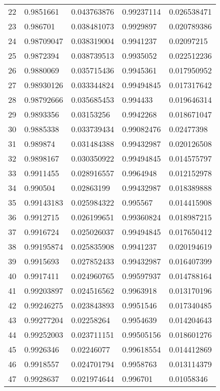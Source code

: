 \begin{table}[H]
{\begin{tabular}{@{}lllll@{}}
    22 & 0.9851661 & 0.043763876 & 0.99237114 & 0.026538471 \\
    23 & 0.986701 & 0.038481073 & 0.9929897 & 0.020789386 \\
    24 & 0.98709047 & 0.038319004 & 0.9941237 & 0.02097215 \\
    25 & 0.9872394 & 0.038739513 & 0.9935052 & 0.022512236 \\
    26 & 0.9880069 & 0.035715436 & 0.9945361 & 0.017950952 \\
    27 & 0.98930126 & 0.033344824 & 0.99494845 & 0.017317642 \\
    28 & 0.98792666 & 0.035685453 & 0.994433 & 0.019646314 \\
    29 & 0.9893356 & 0.03153256 & 0.9942268 & 0.018671047 \\
    30 & 0.9885338 & 0.033739434 & 0.99082476 & 0.02477398 \\
    31 & 0.989874 & 0.031484388 & 0.99432987 & 0.020126508 \\
    32 & 0.9898167 & 0.030350922 & 0.99494845 & 0.014575797 \\
    33 & 0.9911455 & 0.028916557 & 0.9964948 & 0.012152978 \\
    34 & 0.990504 & 0.02863199 & 0.99432987 & 0.018389888 \\
    35 & 0.99143183 & 0.025984322 & 0.995567 & 0.014415908 \\
    36 & 0.9912715 & 0.026199651 & 0.99360824 & 0.018987215 \\
    37 & 0.9916724 & 0.025026037 & 0.99494845 & 0.017650412 \\
    38 & 0.99195874 & 0.025835908 & 0.9941237 & 0.020194619 \\
    39 & 0.9915693 & 0.027852433 & 0.99432987 & 0.016407399 \\
    40 & 0.9917411 & 0.024960765 & 0.99597937 & 0.014788164 \\
    41 & 0.99203897 & 0.024516562 & 0.9963918 & 0.013170196 \\
    42 & 0.99246275 & 0.023843893 & 0.9951546 & 0.017340485 \\
    43 & 0.99277204 & 0.02258264 & 0.9954639 & 0.014204643 \\
    44 & 0.99252003 & 0.023711151 & 0.99505156 & 0.018601276 \\
    45 & 0.9926346 & 0.02246077 & 0.99618554 & 0.014412869 \\
    46 & 0.9918557 & 0.024701794 & 0.9958763 & 0.013114379 \\
    47 & 0.9928637 & 0.021974644 & 0.996701 & 0.01058346 \\

\end{tabular}}
\end{table}
